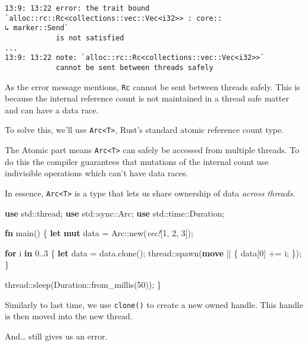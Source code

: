 \documentclass[a4paper,]{book}
\newenvironment{Shaded}{\begin{snugshade}}{\end{snugshade}}
\newcommand{\KeywordTok}[1]{\textcolor[rgb]{0.13,0.29,0.53}{\textbf{{#1}}}}
\newcommand{\DecValTok}[1]{\textcolor[rgb]{0.00,0.00,0.81}{{#1}}}
\newcommand{\PreprocessorTok}[1]{\textcolor[rgb]{0.56,0.35,0.01}{\textit{{#1}}}}
\newcommand{\NormalTok}[1]{{#1}}
\begin{document}
\begin{verbatim}
13:9: 13:22 error: the trait bound `alloc::rc::Rc<collections::vec::Vec<i32>> : core::
↳ marker::Send`
            is not satisfied
...
13:9: 13:22 note: `alloc::rc::Rc<collections::vec::Vec<i32>>`
            cannot be sent between threads safely
\end{verbatim}

As the error message mentions, \texttt{Rc} cannot be sent between
threads safely. This is because the internal reference count is not
maintained in a thread safe matter and can have a data race.

To solve this, we'll use \texttt{Arc\textless{}T\textgreater{}}, Rust's
standard atomic reference count type.

The Atomic part means \texttt{Arc\textless{}T\textgreater{}} can safely
be accessed from multiple threads. To do this the compiler guarantees
that mutations of the internal count use indivisible operations which
can't have data races.

In essence, \texttt{Arc\textless{}T\textgreater{}} is a type that lets
us share ownership of data \emph{across threads}.

\begin{Shaded}
\begin{Highlighting}[]
\KeywordTok{use} \NormalTok{std::thread;}
\KeywordTok{use} \NormalTok{std::sync::Arc;}
\KeywordTok{use} \NormalTok{std::time::Duration;}

\KeywordTok{fn} \NormalTok{main() \{}
    \KeywordTok{let} \KeywordTok{mut} \NormalTok{data = Arc::new(}\PreprocessorTok{vec!}\NormalTok{[}\DecValTok{1}\NormalTok{, }\DecValTok{2}\NormalTok{, }\DecValTok{3}\NormalTok{]);}

    \KeywordTok{for} \NormalTok{i }\KeywordTok{in} \DecValTok{0.}\NormalTok{.}\DecValTok{3} \NormalTok{\{}
        \KeywordTok{let} \NormalTok{data = data.clone();}
        \NormalTok{thread::spawn(}\KeywordTok{move} \NormalTok{|| \{}
            \NormalTok{data[}\DecValTok{0}\NormalTok{] += i;}
        \NormalTok{\});}
    \NormalTok{\}}

    \NormalTok{thread::sleep(Duration::from_millis(}\DecValTok{50}\NormalTok{));}
\NormalTok{\}}
\end{Highlighting}
\end{Shaded}

Similarly to last time, we use \texttt{clone()} to create a new owned
handle. This handle is then moved into the new thread.

And\ldots{} still gives us an error.
\end{document}
